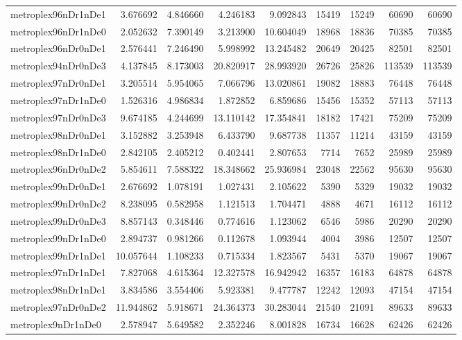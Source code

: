 \begin{longtable}{|l|r|r|r|r|r|r|r|r|}
metroplex96nDr1nDe1 & 3.676692 & 4.846660 & 4.246183 & 9.092843 & 15419 & 15249 & 60690 & 60690 \\
metroplex96nDr1nDe0 & 2.052632 & 7.390149 & 3.213900 & 10.604049 & 18968 & 18836 & 70385 & 70385 \\
metroplex96nDr0nDe1 & 2.576441 & 7.246490 & 5.998992 & 13.245482 & 20649 & 20425 & 82501 & 82501 \\
metroplex94nDr0nDe3 & 4.137845 & 8.173003 & 20.820917 & 28.993920 & 26726 & 25826 & 113539 & 113539 \\
metroplex97nDr0nDe1 & 3.205514 & 5.954065 & 7.066796 & 13.020861 & 19082 & 18883 & 76448 & 76448 \\
metroplex97nDr1nDe0 & 1.526316 & 4.986834 & 1.872852 & 6.859686 & 15456 & 15352 & 57113 & 57113 \\
metroplex97nDr0nDe3 & 9.674185 & 4.244699 & 13.110142 & 17.354841 & 18182 & 17421 & 75209 & 75209 \\
metroplex98nDr0nDe1 & 3.152882 & 3.253948 & 6.433790 & 9.687738 & 11357 & 11214 & 43159 & 43159 \\
metroplex98nDr1nDe0 & 2.842105 & 2.405212 & 0.402441 & 2.807653 & 7714 & 7652 & 25989 & 25989 \\
metroplex96nDr0nDe2 & 5.854611 & 7.588322 & 18.348662 & 25.936984 & 23048 & 22562 & 95630 & 95630 \\
metroplex99nDr0nDe1 & 2.676692 & 1.078191 & 1.027431 & 2.105622 & 5390 & 5329 & 19032 & 19032 \\
metroplex99nDr0nDe2 & 8.238095 & 0.582958 & 1.121513 & 1.704471 & 4888 & 4671 & 16112 & 16112 \\
metroplex99nDr0nDe3 & 8.857143 & 0.348446 & 0.774616 & 1.123062 & 6546 & 5986 & 20290 & 20290 \\
metroplex99nDr1nDe0 & 2.894737 & 0.981266 & 0.112678 & 1.093944 & 4004 & 3986 & 12507 & 12507 \\
metroplex99nDr1nDe1 & 10.057644 & 1.108233 & 0.715334 & 1.823567 & 5431 & 5370 & 19067 & 19067 \\
metroplex97nDr1nDe1 & 7.827068 & 4.615364 & 12.327578 & 16.942942 & 16357 & 16183 & 64878 & 64878 \\
metroplex98nDr1nDe1 & 3.834586 & 3.554406 & 5.923381 & 9.477787 & 12242 & 12093 & 47154 & 47154 \\
metroplex97nDr0nDe2 & 11.944862 & 5.918671 & 24.364373 & 30.283044 & 21540 & 21091 & 89633 & 89633 \\
metroplex9nDr1nDe0 & 2.578947 & 5.649582 & 2.352246 & 8.001828 & 16734 & 16628 & 62426 & 62426 \\

\end{longtable}
